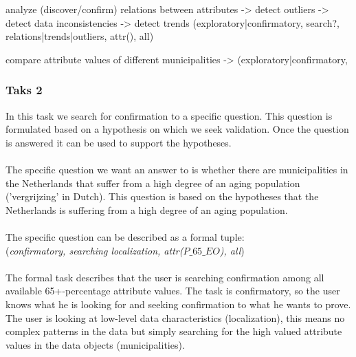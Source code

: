 analyze (discover/confirm) relations between attributes
    -> detect outliers
    -> detect data inconsistencies
    -> detect trends
(exploratory|confirmatory, search?, relations|trends|outliers, attr(), all)

compare attribute values of different municipalities
    -> 
(exploratory|confirmatory, 








\subsubsection{Taks 2}
In this task we search for confirmation to a specific question.
This question is formulated based on a hypothesis on which we seek validation.
Once the question is answered it can be used to support the hypotheses.\\
\\
The specific question we want an answer to is whether there are municipalities in the Netherlands that suffer from a high degree of an aging population ('vergrijzing' in Dutch).
This question is based on the hypotheses that the Netherlands is suffering from a high degree of an aging population.\\
\\
The specific question can be described as a formal tuple:\\
(\textit{confirmatory, searching localization, attr($P\_65\_EO$), all})\\
\\
The formal task describes that the user is searching confirmation among all available 65+-percentage attribute values.
The task is confirmatory, so the user knows what he is looking for and seeking confirmation to what he wants to prove.
The user is looking at low-level data characteristics (localization), this means no complex patterns in the data but simply searching for the high valued attribute values in the data objects (municipalities).
